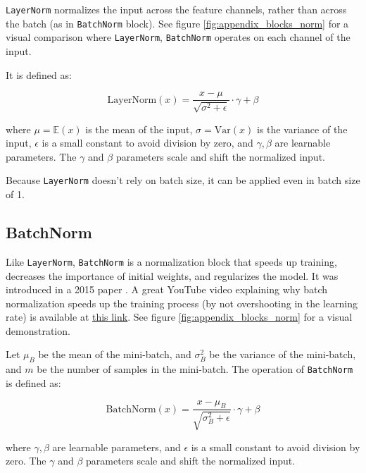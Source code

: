 \texttt{LayerNorm} normalizes the input across the feature channels, rather than across the batch (as in \texttt{BatchNorm} block). See figure \ref{fig:appendix_blocks_norm} for a visual comparison where \texttt{LayerNorm}, \texttt{BatchNorm} operates on each channel of the input.

It is defined as:

\begin{equation*}
    \text{LayerNorm}(x) = \frac{x - \mu}{\sqrt{\sigma^2 + \epsilon}} \cdot \gamma + \beta
\end{equation*}

where $\mu = \mathbb{E}(x)$ is the mean of the input, $\sigma = \text{Var} (x)$ is the variance of the input, $\epsilon$ is a small constant to avoid division by zero, and $\gamma, \beta$ are learnable parameters. The $\gamma$ and $\beta$ parameters scale and shift the normalized input.

Because \texttt{LayerNorm} doesn't rely on batch size, it can be applied even in batch size of 1.








\subsection*{BatchNorm}

Like \texttt{LayerNorm}, \texttt{BatchNorm} is a normalization block that speeds up training, decreases the importance of initial weights, and regularizes the model. It was introduced in a 2015 paper \cite{batchnorm}. A great YouTube video explaining why batch normalization speeds up the training process (by not overshooting in the learning rate) is available at \href{https://www.youtube.com/watch?v=DtEq44FTPM4}{this link}. See figure \ref{fig:appendix_blocks_norm} for a visual demonstration.

Let $\mu_B$ be the mean of the mini-batch, and $\sigma^2_B$ be the variance of the mini-batch, and $m$ be the number of samples in the mini-batch. The operation of \texttt{BatchNorm} is defined as:

\begin{equation*}
    \text{BatchNorm}(x) = \frac{x - \mu_B}{\sqrt{\sigma^2_B + \epsilon}} \cdot \gamma + \beta
\end{equation*}

where $\gamma, \beta$ are learnable parameters, and $\epsilon$ is a small constant to avoid division by zero. The $\gamma$ and $\beta$ parameters scale and shift the normalized input.








